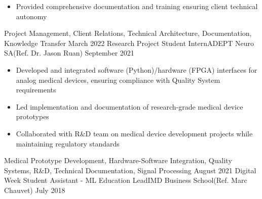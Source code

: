 \begin{experiences}
{\begin{itemize}
                        \item Provided comprehensive documentation and training ensuring client technical autonomy
                      \end{itemize}
                    }
                    {Project Management, Client Relations, Technical Architecture, Documentation, Knowledge Transfer}
  \emptySeparator
  \experience
    {March 2022}   {Research Project Student Intern}{ADEPT Neuro SA}{(Ref. Dr. Jason Ruan)}
    {September 2021} {
                      \begin{itemize}
                        \item Developed and integrated software (Python)/hardware (FPGA) interfaces for analog medical devices, ensuring compliance with Quality System requirements
                        \item Led implementation and documentation of research-grade medical device prototypes
                        \item Collaborated with R\&D team on medical device development projects while maintaining regulatory standards
                      \end{itemize}
                    }
                    {Medical Prototype Development, Hardware-Software Integration, Quality Systems, R\&D, Technical Documentation, Signal Processing}%
  \emptySeparator
\experience
    {August 2021}   {Digital Week Student Assistant - ML Education Lead}{IMD Business School}{(Ref. Marc Chauvet)}
    {July 2018} {
                      \begin{itemize}

\end{itemize}}
\end{experiences}
